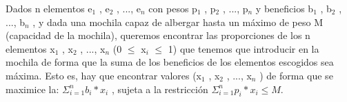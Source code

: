 Dados n elementos e$_{ 1}$ , e$_{ 2}$ , ..., e$_{n}$ con pesos p$_{ 1}$ , p$_{ 2}$ , ..., p$_{n}$ y beneficios b$_{ 1}$ , b$_{ 2}$ , ..., b$_{n}$ , y dada una mochila capaz de albergar hasta un máximo de peso M (capacidad de la mochila), queremos encontrar las proporciones de los n elementos x$_{ 1}$ , x$_{ 2}$ , ..., x$_{ n}$ (0 $\leq$ x$_{ i}$ $\leq$ 1) que tenemos que introducir en la mochila de forma que la suma de los beneficios de los elementos escogidos sea máxima.
Esto es, hay que encontrar valores (x$_{ 1}$ , x$_{ 2}$ , ..., x$_{ n}$ ) de forma que se maximice la: $\Sigma^{n}_{i=1} b_{i}*x_{i}$ , sujeta a la restricción  $\Sigma^{n}_{i=1} p_{i}*x_{i} \leq M$.
